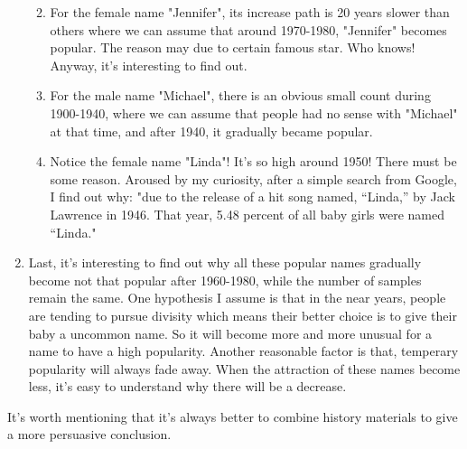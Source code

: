 \documentclass[11pt]{article}
\begin{document}
\begin{enumerate}
  \begin{enumerate}
  \def\labelenumii{\alph{enumii}.}
  \item
    For the female name "Jennifer", its increase path is 20 years slower
    than others where we can assume that around 1970-1980, "Jennifer"
    becomes popular. The reason may due to certain famous star. Who
    knows! Anyway, it's interesting to find out.
  \item
    For the male name "Michael", there is an obvious small count during
    1900-1940, where we can assume that people had no sense with
    "Michael" at that time, and after 1940, it gradually became popular.
  \item
    Notice the female name "Linda"! It's so high around 1950! There must
    be some reason. Aroused by my curiosity, after a simple search from
    Google, I find out why: "due to the release of a hit song named,
    ``Linda,'' by Jack Lawrence in 1946. That year, 5.48 percent of all
    baby girls were named ``Linda."
  \end{enumerate}
\item
  Last, it's interesting to find out why all these popular names
  gradually become not that popular after 1960-1980, while the number of
  samples remain the same. One hypothesis I assume is that in the near
  years, people are tending to pursue divisity which means their better
  choice is to give their baby a uncommon name. So it will become more
  and more unusual for a name to have a high popularity. Another
  reasonable factor is that, temperary popularity will always fade away.
  When the attraction of these names become less, it's easy to
  understand why there will be a decrease.
\end{enumerate}

It's worth mentioning that it's always better to combine history
materials to give a more persuasive conclusion.
\end{document}
